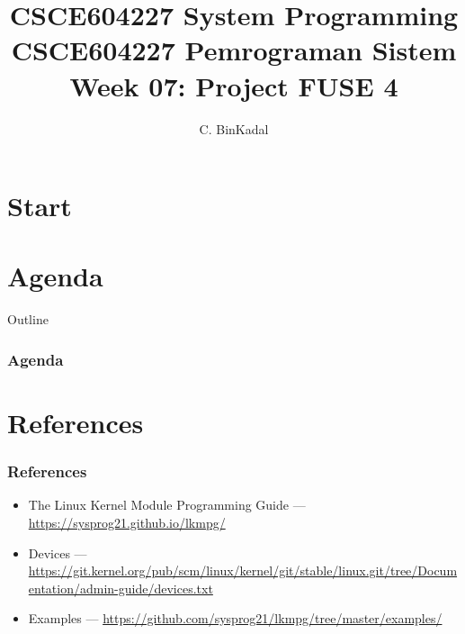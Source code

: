 \documentclass[aspectratio=169, xcolor=table, notheorems, hyperref={pdfpagelabels=false}]{beamer}
\title[\kopikopi]
{CSCE604227 System Programming \\
CSCE604227 Pemrograman Sistem \\
Week 07:
Project FUSE 4}
\author{C. BinKadal}
\institute[SDN]
{
Sendirian Berhad\\
\medskip
\url{https://sp.vlsm.org/Slides/sp07.pdf}
\\ \texttt{Always check for the latest revision!}
}
\date{\revision}
\begin{document}
\lstset{
basicstyle=\ttfamily\tiny, %
breakatwhitespace=true,
language=C,
columns=fullflexible,
keepspaces=true,
breaklines=true,
tabsize=3, 
showstringspaces=false,
extendedchars=true}

\section{Start}
\begin{frame}
\titlepage
\end{frame}




\section{Agenda}
\begin{frame}{Outline}
  \frametitle{Agenda}
  \tableofcontents[sections={1-}]
\end{frame}

\section{References}
\begin{frame}[fragile]
\frametitle{References}
\begin{itemize}
\item The Linux Kernel Module Programming Guide --- \url{https://sysprog21.github.io/lkmpg/}
\item Devices ---
      \url{https://git.kernel.org/pub/scm/linux/kernel/git/stable/linux.git/tree/Documentation/admin-guide/devices.txt}
\item Examples ---
      \url{https://github.com/sysprog21/lkmpg/tree/master/examples/}
\end{itemize}
\end{frame}
\end{document}
